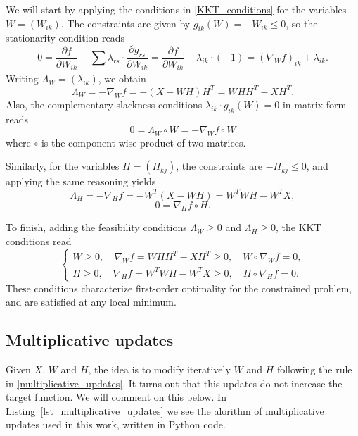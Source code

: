 \documentclass{amsart}
\begin{document}
We will start by applying the conditions in \eqref{KKT_conditions} for the variables $W=(W_{ik})$. The constraints are given by $g_{ik}(W)= -W_{ik}\leq 0$, so the stationarity condition reads
\[
    0= \frac{\partial f}{\partial W_{ik}} -\sum_{} \lambda_{rs}\cdot \frac{\partial g_{rs}}{\partial W_{ik}} = \frac{\partial f}{\partial W_{ik}} -\lambda_{ik}\cdot (-1)= \left(\nabla_W f\right)_{ik} +\lambda_{ik}.
\]
Writing $\Lambda_W=(\lambda_{ik})$, we obtain
\[
    \Lambda_W= -\nabla_W f= -(X-WH)H^T= WHH^T -XH^T.
\]
Also, the complementary slackness conditions $\lambda_{ik}\cdot g_{ik}(W)=0$ in matrix form reads
\[
    0= \Lambda_W\circ W= -\nabla_W f\circ W
\]
where $\circ$ is the component-wise product of two matrices.

Similarly, for the variables $H=(H_{kj})$, the constraints are $-H_{kj}\leq 0$, and applying the same reasoning yields
\[
    \Lambda_H= -\nabla_H f= -W^T(X-WH)= W^TWH -W^TX,
\]
\[
    0= \nabla_H f\circ H.
\]

To finish, adding the feasibility conditions $\Lambda_W\geq 0$ and $\Lambda_H\geq 0$, the KKT conditions read
\begin{equation}
    \label{first_order_optimality_conditions}
    \begin{cases}
        W \geq 0,\quad \nabla_W f = WHH^T - XH^T \geq 0,\quad W \circ \nabla_W f = 0, \\
        H \geq 0,\quad \nabla_H f = W^TWH - W^TX \geq 0,\quad H \circ \nabla_H f = 0.
    \end{cases}
\end{equation}
These conditions characterize first-order optimality for the constrained problem, and are satisfied at any local minimum.

\subsection{Multiplicative updates}

Given $X$, $W$ and $H$, the idea is to modify iteratively $W$ and $H$ following the rule in \eqref{multiplicative_updates}. It turns out that this updates do not increase the target function. We will comment on this below. In Listing~\ref{lst_multiplicative_updates} we see the alorithm of multiplicative updates used in this work, written in Python code.
\end{document}
